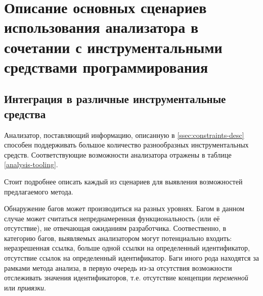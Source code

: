 \chapter{Описание основных сценариев использования анализатора в сочетании с
инструментальными средствами программирования}

\section{Интеграция в различные инструментальные средства}

Анализатор, поставляющий информацию, описанную в \ref{ssec:constraints-desc} способен
поддерживать большое количество разнообразных инструментальных средств. Соответствующие
возможности анализатора отражены в таблице \ref{analysis-tooling}.

\begin{table}[h]
    \caption{Поддержка анализатором различных сценариев использования инструментальных средств}
    \label{analysis-tooling}
\end{table}

Стоит подробнее описать каждый из сценариев для выявления возможностей предлагаемого метода.

Обнаружение багов может производиться на разных уровнях. Багом в данном случае может
считаться непреднамеренная функциональность (или её отсутствие), не отвечающая ожиданиям разработчика.
Соотвественно, в категорию багов, выявляемых анализатором могут потенциально входить:
неразрешенная ссылка, больше одной ссылки на определенный идентификатор, отсутствие ссылок
на определенный идентификатор. Баги иного рода находятся за рамками метода анализа, в первую
очередь из-за отсутствия возможности отслеживать значения идентификаторов, т.е.
отсутствие концепции \textit{переменной} или \textit{привязки}.


